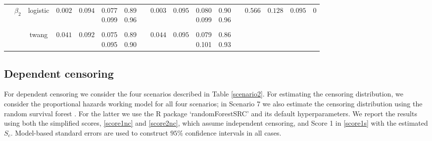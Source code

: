 \documentclass[11pt]{article}
\begin{document}
\begin{table}[h]
\begin{center}
\begin{tabular}{cccrccccrccccrccc}
& \multirow{2}{*}{$\beta_2$} & logistic
&$0.002$ & $0.094$   &\Centerstack{0.077 \\ 0.099} & \Centerstack{0.89 \\ 0.96}& &$0.003$ & $0.095$  & \Centerstack{0.080\\ 0.099}  & \Centerstack{0.90\\0.96} 
& \multirow{2}{*}{} &  \multirow{2}{*}{$0.566$} & \multirow{2}{*}{$0.128$} & \multirow{2}{*}{$0.095$} & \multirow{2}{*}{$0$}  \tabularnewline
\\[-1.5ex] 

& & twang 
&$0.041$&$0.092$   &\Centerstack{0.075 \\ 0.095} & \Centerstack{0.89 \\ 0.90}&& $0.044$ & $0.095$  & \Centerstack{0.079\\ 0.101}  & \Centerstack{0.86\\ 0.93} &  & &  & & \tabularnewline 
\hline
\end{tabular}
\end{center}
\end{table}


\subsection{Dependent censoring}\label{cens}

For dependent censoring we consider the four scenarios described in Table \ref{scenario2}.
For estimating the censoring distribution, we consider the proportional hazards working model for all four scenarios; 
in Scenario 7 we also estimate the censoring distribution using the random survival forest \citep{ishwaran2008random}.  For the latter we use the R package `randomForestSRC' and its default hyperparameters.
We report the results using both the simplified scores, \eqref{score1nc} and \eqref{score2nc}, which assume independent censoring, %
and Score 1 in \eqref{score1s} with the estimated $S_c$. %
Model-based standard errors %
are used to construct $95\%$ confidence intervals in all cases.
\end{document}
